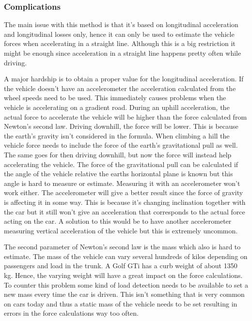 \subsubsection{Complications}
The main issue with this method is that it's based on longitudinal acceleration and longitudinal losses only, hence it can only be used to estimate the vehicle forces when accelerating in a straight line. Although this is a big restriction it might be enough since acceleration in a straight line happens pretty often while driving.

A major hardship is to obtain a proper value for the longitudinal acceleration. If the vehicle doesn't have an accelerometer the acceleration calculated from the wheel speeds need to be used. This immediately causes problems when the vehicle is accelerating on a gradient road. During an uphill acceleration, the actual force to accelerate the vehicle will be higher than the force calculated from Newton's second law. Driving downhill, the force will be lower. This is because the earth's gravity isn't considered in the formula. When climbing a hill the vehicle force needs to include the force of the earth's gravitational pull as well. The same goes for then driving downhill, but now the force will instead help accelerating the vehicle. The force of the gravitational pull can be calculated if the angle of the vehicle relative the earths horizontal plane is known but this angle is hard to measure or estimate. Measuring it with an accelerometer won't work either. The accelerometer will give a better result since the force of gravity is affecting it in some way. This is because it's changing inclination together with the car but it still won't give an acceleration that corresponds to the actual force acting on the car. A solution to this would be to have another accelerometer measuring vertical acceleration of the vehicle but this is extremely uncommon.

The second parameter of Newton's second law is the mass which also is hard to estimate. The mass of the vehicle can vary several hundreds of kilos depending on passengers and load in the trunk. A Golf GTi has a curb weight of about 1350 kg. Hence, the varying weight will have a great impact on the force calculations. To counter this problem some kind of load detection needs to be available to set a new mass every time the car is driven. This isn't something that is very common on cars today and thus a static mass of the vehicle needs to be set resulting in errors in the force calculations way too often.

